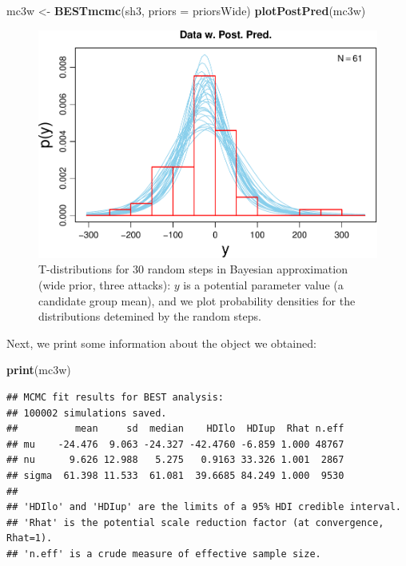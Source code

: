 \documentclass[10pt,]{scrartcl}
\newenvironment{Shaded}{\begin{snugshade}}{\end{snugshade}}
\newcommand{\KeywordTok}[1]{\textcolor[rgb]{0.13,0.29,0.53}{\textbf{#1}}}
\newcommand{\DataTypeTok}[1]{\textcolor[rgb]{0.13,0.29,0.53}{#1}}
\newcommand{\StringTok}[1]{\textcolor[rgb]{0.31,0.60,0.02}{#1}}
\newcommand{\NormalTok}[1]{#1}
\begin{document}
\footnotesize

\begin{Shaded}
\begin{Highlighting}[]
\NormalTok{mc3w <-}\StringTok{ }\KeywordTok{BESTmcmc}\NormalTok{(sh3, }\DataTypeTok{priors =}\NormalTok{ priorsWide)}
\KeywordTok{plotPostPred}\NormalTok{(mc3w)}
\end{Highlighting}
\end{Shaded}

\normalsize

\begin{figure}

\begin{center}\includegraphics[width=1\linewidth]{redditAnalysisWalkthrough_files/figure-latex/unnamed-chunk-49-1} \end{center}
\label{fig:threeWidePostPred}
\caption{T-distributions for 30 random steps in Bayesian approximation (wide prior, three attacks): $y$ is a potential parameter value (a candidate group mean), and we plot probability densities for the distributions detemined by the random steps.}
\end{figure}

Next, we print some information about the object we obtained:

\footnotesize

\begin{Shaded}
\begin{Highlighting}[]
\KeywordTok{print}\NormalTok{(mc3w)}
\end{Highlighting}
\end{Shaded}

\begin{verbatim}
## MCMC fit results for BEST analysis:
## 100002 simulations saved.
##          mean     sd  median    HDIlo  HDIup  Rhat n.eff
## mu    -24.476  9.063 -24.327 -42.4760 -6.859 1.000 48767
## nu      9.626 12.988   5.275   0.9163 33.326 1.001  2867
## sigma  61.398 11.533  61.081  39.6685 84.249 1.000  9530
## 
## 'HDIlo' and 'HDIup' are the limits of a 95% HDI credible interval.
## 'Rhat' is the potential scale reduction factor (at convergence, Rhat=1).
## 'n.eff' is a crude measure of effective sample size.
\end{verbatim}
\end{document}
